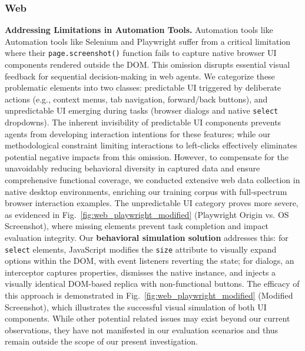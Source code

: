 \subsubsection{Web}
\label{appendix:web_lessons}


\textbf{Addressing Limitations in Automation Tools.} Automation tools like Automation tools like Selenium and Playwright suffer from a critical limitation where their \texttt{page.screenshot()} function fails to capture native browser UI components rendered outside the DOM. This omission disrupts essential visual feedback for sequential decision-making in web agents. We categorize these problematic elements into two classes: predictable UI triggered by deliberate actions (e.g., context menus, tab navigation, forward/back buttons), and unpredictable UI emerging during tasks (browser dialogs and native \texttt{select} dropdowns). The inherent invisibility of predictable UI components prevents agents from developing interaction intentions for these features; while our methodological constraint limiting interactions to left-clicks effectively eliminates potential negative impacts from this omission. However, to compensate for the unavoidably reducing behavioral diversity in captured data and ensure comprehensive functional coverage, we conducted extensive web data collection in native desktop environments, enriching our training corpus with full-spectrum browser interaction examples. The unpredictable UI category proves more severe, as evidenced in Fig.~\ref{fig:web_playwright_modified} (Playwright Origin vs. OS Screenshot), where missing elements prevent task completion and impact evaluation integrity. Our \textbf{behavioral simulation solution} addresses this: for \texttt{select} elements, JavaScript modifies the \texttt{size} attribute to visually expand options within the DOM, with event listeners reverting the state; for dialogs, an interceptor captures properties, dismisses the native instance, and injects a visually identical DOM-based replica with non-functional buttons. The efficacy of this approach is demonstrated in Fig.~\ref{fig:web_playwright_modified} (Modified Screenshot), which illustrates the successful visual simulation of both UI components. While other potential related issues may exist beyond our current observations, they have not manifested in our evaluation scenarios and thus remain outside the scope of our present investigation. 

